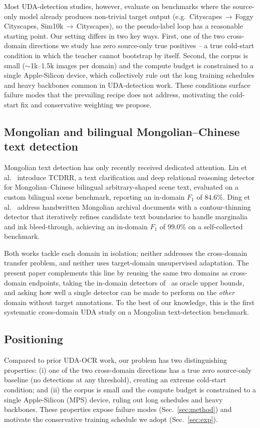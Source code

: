 Most UDA-detection studies, however, evaluate on benchmarks where
the source-only model already produces non-trivial target output
(e.g.\ Cityscapes\,$\to$\,Foggy Cityscapes, Sim10k\,$\to$\,Cityscapes),
so the pseudo-label loop has a reasonable starting point. Our
setting differs in two key ways. First, one of the two cross-domain
directions we study has zero source-only true positives -- a true
cold-start condition in which the teacher cannot bootstrap by
itself. Second, the corpus is small ($\sim$1k--1.5k images per
domain) and the compute budget is constrained to a single
Apple-Silicon device, which collectively rule out the long training
schedules and heavy backbones common in UDA-detection work. These
conditions surface failure modes that the prevailing recipe does not
address, motivating the cold-start fix and conservative weighting we
propose.

\subsection{Mongolian and bilingual Mongolian--Chinese text detection}
Mongolian text detection has only recently received dedicated
attention. Liu et al.~\cite{liu2025tcdrr} introduce TCDRR, a text
clarification and deep relational reasoning detector for
Mongolian--Chinese bilingual arbitrary-shaped scene text, evaluated
on a custom bilingual scene benchmark, reporting an in-domain
$F_1$ of $84.6\%$. Ding et al.~\cite{ding2026contour} address
handwritten Mongolian archival documents with a contour-thinning
detector that iteratively refines candidate text boundaries to
handle marginalia and ink bleed-through, achieving an in-domain
$F_1$ of $99.0\%$ on a self-collected benchmark.

Both works tackle each domain in isolation; neither addresses the
cross-domain transfer problem, and neither uses target-domain
unsupervised adaptation. The present paper complements this line by
reusing the same two domains as cross-domain endpoints, taking the
in-domain detectors of~\cite{liu2025tcdrr,ding2026contour} as oracle
upper bounds, and asking how well a single detector can be made to
perform on the \emph{other} domain without target annotations. To the
best of our knowledge, this is the first systematic cross-domain UDA
study on a Mongolian text-detection benchmark.

\subsection{Positioning}
Compared to prior UDA-OCR work, our problem has two distinguishing properties:
(i) one of the two cross-domain directions has a true zero source-only
baseline (no detections at any threshold), creating an extreme cold-start
condition; and (ii) the corpus is small and the compute budget is constrained
to a single Apple-Silicon (MPS) device, ruling out long schedules and
heavy backbones. These properties expose failure modes (Sec.~\ref{sec:method})
and motivate the conservative training schedule we adopt
(Sec.~\ref{sec:exp}).
